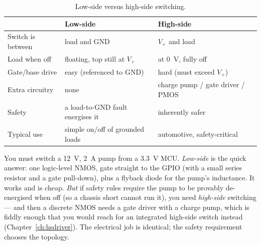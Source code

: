 \documentclass[11pt,a4paper,oneside]{book}
\begin{document}
\begin{table}[h]
\centering
\caption{Low-side versus high-side switching.}
\small
\begin{tabular}{@{}lll@{}}
\toprule
 & \textbf{Low-side} & \textbf{High-side}\\
\midrule
Switch is between & load and GND & $V_+$ and load\\
Load when off     & floating, top still at $V_+$ & at \qty{0}{\volt}, fully off\\
Gate/base drive   & easy (referenced to GND) & hard (must exceed $V_+$)\\
Extra circuitry   & none & charge pump / gate driver / PMOS\\
Safety            & a load-to-GND fault energises it & inherently safer\\
Typical use       & simple on/off of grounded loads & automotive, safety-critical\\
\bottomrule
\end{tabular}
\end{table}

\begin{wexample}
You must switch a \qty{12}{\volt}, \qty{2}{\ampere} pump from a
\qty{3.3}{\volt} MCU. \emph{Low-side} is the quick answer: one logic-level NMOS,
gate straight to the GPIO (with a small series resistor and a gate pull-down),
plus a flyback diode for the pump's inductance. It works and is cheap. \emph{But}
if safety rules require the pump to be provably de-energised when off (so a
chassis short cannot run it), you need \emph{high-side} switching --- and then a
discrete NMOS needs a gate driver with a charge pump, which is fiddly enough that
you would reach for an integrated high-side switch instead
(Chapter~\ref{ch:hsdriver}). The electrical job is identical; the safety
requirement chooses the topology.
\end{wexample}
\end{document}
